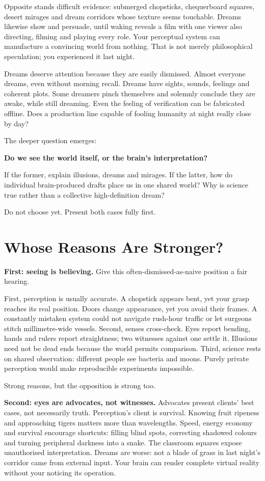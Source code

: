 Opposite stands difficult evidence: submerged chopsticks, chequerboard squares, desert mirages and dream corridors whose texture seems touchable. Dreams likewise show and persuade, until waking reveals a film with one viewer also directing, filming and playing every role. Your perceptual system can manufacture a convincing world from nothing. That is not merely philosophical speculation; you experienced it last night.

Dreams deserve attention because they are easily dismissed. Almost everyone dreams, even without morning recall. Dreams have sights, sounds, feelings and coherent plots. Some dreamers pinch themselves and solemnly conclude they are awake, while still dreaming. Even the feeling of verification can be fabricated offline. Does a production line capable of fooling humanity at night really close by day?

The deeper question emerges:

\textbf{Do we see the world itself, or the brain's interpretation?}

If the former, explain illusions, dreams and mirages. If the latter, how do individual brain-produced drafts place us in one shared world? Why is science true rather than a collective high-definition dream?

Do not choose yet. Present both cases fully first.

\section{Whose Reasons Are Stronger?}
\textbf{First: seeing is believing.} Give this often-dismissed-as-naive position a fair hearing.

First, perception is usually accurate. A chopstick appears bent, yet your grasp reaches its real position. Doors change appearance, yet you avoid their frames. A constantly mistaken system could not navigate rush-hour traffic or let surgeons stitch millimetre-wide vessels. Second, senses cross-check. Eyes report bending, hands and rulers report straightness; two witnesses against one settle it. Illusions need not be dead ends because the world permits comparison. Third, science rests on shared observation: different people see bacteria and moons. Purely private perception would make reproducible experiments impossible.

Strong reasons, but the opposition is strong too.

\textbf{Second: eyes are advocates, not witnesses.} Advocates present clients' best cases, not necessarily truth. Perception's client is survival. Knowing fruit ripeness and approaching tigers matters more than wavelengths. Speed, energy economy and survival encourage shortcuts: filling blind spots, correcting shadowed colours and turning peripheral darkness into a snake. The classroom squares expose unauthorised interpretation. Dreams are worse: not a blade of grass in last night's corridor came from external input. Your brain can render complete virtual reality without your noticing its operation.

